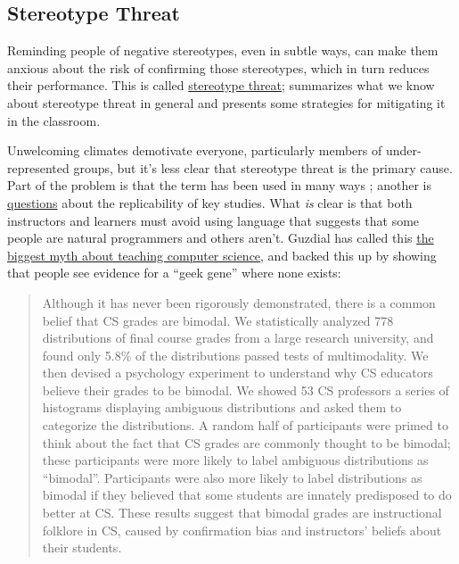 \subsection{Stereotype Threat}\label{stereotype-threat}

Reminding people of negative stereotypes, even in subtle ways, can make
them anxious about the risk of confirming those stereotypes, which in
turn reduces their performance. This is called
\protect\hyperlink{g:stereotype-threat}{stereotype threat}; \cite{Stee2011}
summarizes what we know about stereotype threat in general and presents
some strategies for mitigating it in the classroom.

Unwelcoming climates demotivate everyone, particularly members of
under-represented groups, but it's less clear that stereotype threat
is the primary cause. Part of the problem is that the term has been
used in many ways \cite{Shap2007}; another is
\href{https://www.psychologytoday.com/blog/rabble-rouser/201512/is-stereotype-threat-overcooked-overstated-and-oversold}{questions} about the replicability of
key studies. What \emph{is} clear is that both instructors and learners
must avoid using language that suggests that some people are natural
programmers and others aren't. Guzdial has called this \href{https://cacm.acm.org/blogs/blog-cacm/189498-top-10-myths-about-teaching-computer-science/fulltext}{the biggest
myth about teaching computer science}, and
\cite{Pati2016} backed this up by showing that people see evidence
for a ``geek gene'' where none exists:

\begin{quote}\setlength{\parindent}{0pt}
Although it has never been rigorously demonstrated, there is a common
belief that CS grades are bimodal. We statistically analyzed 778
distributions of final course grades from a large research university,
and found only 5.8\% of the distributions passed tests of
multimodality. We then devised a psychology experiment to understand
why CS educators believe their grades to be bimodal. We showed 53 CS
professors a series of histograms displaying ambiguous distributions
and asked them to categorize the distributions. A random half of
participants were primed to think about the fact that CS grades are
commonly thought to be bimodal; these participants were more likely to
label ambiguous distributions as ``bimodal''. Participants were also
more likely to label distributions as bimodal if they believed that
some students are innately predisposed to do better at CS. These
results suggest that bimodal grades are instructional folklore in CS,
caused by confirmation bias and instructors' beliefs about their
students.
\end{quote}

